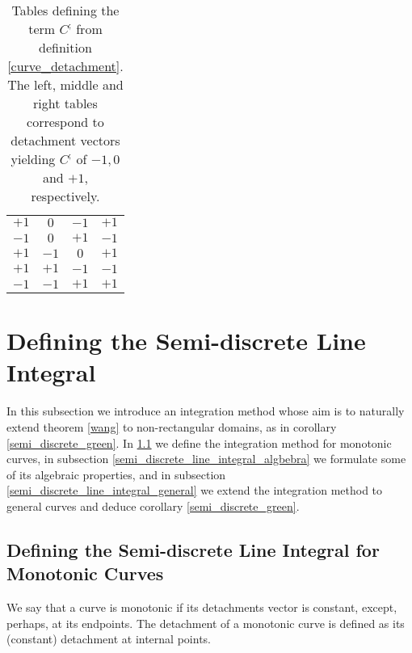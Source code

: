 \documentclass[11pt]{book}
\begin{document}
\begin{table}
\begin{tabular}{cccc}
        $+1$ & $0$ & $-1$ & $+1$\\
        $-1$ & $0$ & $+1$ & $-1$\\
    $+1$ & $-1$ & $0$ & $+1$\\
        $+1$ & $+1$ & $-1$ & $-1$\\
        $-1$ & $-1$ & $+1$ & $+1$\\ 
        \bottomrule
        \end{tabular}
\bigskip
\caption{Tables defining the term $C^;$ from definition \ref{curve_detachment}. The left, middle and right tables correspond to detachment vectors yielding $C^;$ of $-1,0$ and $+1$, respectively.}
\label{detachments_table}
\end{table}
\section{Defining the Semi-discrete Line Integral}\label{semi_discrete_line_integral_section}In this subsection we introduce
an integration method whose aim is to naturally extend theorem \ref{wang}
to non-rectangular domains, as in corollary \ref{semi_discrete_green}. In \ref{semi_discrete_line_integral_monotonic} we define the
integration method for monotonic curves, in subsection \ref{semi_discrete_line_integral_algbebra} we formulate
some of its algebraic properties, and in subsection \ref{semi_discrete_line_integral_general} we extend the integration method to general curves and deduce corollary \ref{semi_discrete_green}.

\subsection{Defining the Semi-discrete Line Integral for Monotonic Curves} \label{semi_discrete_line_integral_monotonic}
\begin{definition}
We say that a curve is monotonic if its detachments vector is constant, except, perhaps, at its endpoints.  The detachment of a monotonic curve is defined as its (constant) detachment at internal points.
\end{definition}
\end{document}
